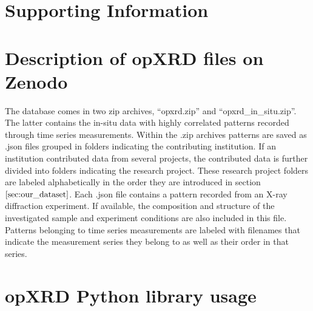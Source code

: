 \documentclass[a4paper]{article}
\begin{document}

\printnomenclature

\clearpage




\setcounter{section}{0}
\renewcommand{\thesection}{S\arabic{section}}
\setcounter{figure}{0}
\renewcommand{\thefigure}{S\arabic{figure}}
\setcounter{table}{0}
\renewcommand{\thetable}{S\arabic{table}}

\section*{Supporting Information}

\section*{Description of opXRD files on Zenodo}
The database comes in two zip archives, ``opxrd.zip'' and ``opxrd\_in\_situ.zip''. The latter contains the in-situ data with highly correlated patterns recorded through time series measurements. Within the .zip archives patterns are saved as .json files grouped in folders indicating the contributing institution. If an institution contributed data from several projects, the contributed data is further divided into folders indicating the research project. These research project folders are labeled alphabetically in the order they are introduced in section $\eqref{sec:our_dataset}$. 
Each .json file contains a pattern recorded from an X-ray diffraction experiment. If available, the composition and structure of the investigated sample and experiment conditions are also included in this file. Patterns belonging to time series measurements are labeled with filenames that indicate the measurement series they belong to as well as their order in that series. 


\section*{opXRD Python library usage}
\end{document}

